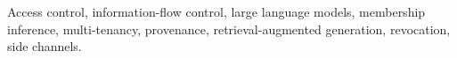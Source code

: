 \begin{IEEEkeywords}
Access control, information-flow control, large language models, membership inference, multi-tenancy, provenance, retrieval-augmented generation, revocation, side channels.
\end{IEEEkeywords}
